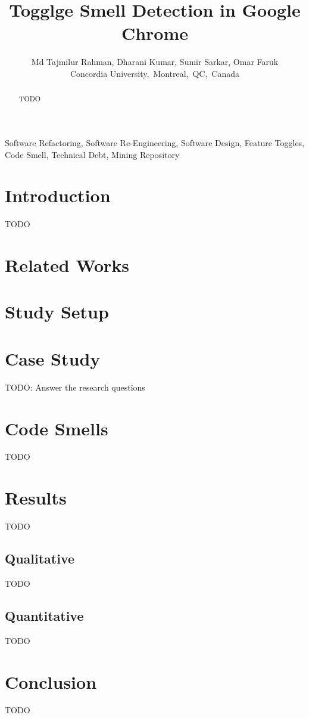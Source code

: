 \documentclass[conference]{IEEEtran}
\begin{document}
\title{Togglge Smell Detection in Google Chrome}
\author{
Md Tajmilur Rahman, Dharani Kumar, Sumir Sarkar, Omar Faruk\\
Concordia University,~Montreal,~QC,~Canada
}
\maketitle

\begin{abstract}
TODO
\end{abstract}

\begin{IEEEkeywords}
Software Refactoring, Software Re-Engineering, Software Design, Feature Toggles, Code Smell, Technical Debt, Mining Repository
\end{IEEEkeywords}

\section{Introduction}
TODO

\section{Related Works}
\label{related-works}

\section{Study Setup}
\label{study-setup}

\section{Case Study}
\label{results}
TODO: Answer the research questions

\section{Code Smells}
\label{discussion}
TODO

\section{Results}
\label{threats}
TODO
\subsection{Qualitative}
TODO
\subsection{Quantitative}
TODO

\section{Conclusion}
\label{conclusion}
TODO





\balance
\end{document}
